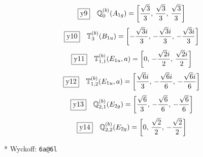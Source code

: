 \documentclass[fleqn,10pt,landscape]{jsarticle}
\begin{document}
\begin{dmath*}
\fbox{y9}\quad \mathbb{Q}_{0}^{(b)}(A_{1g})=\left[ \frac{\sqrt{3}}{3},\, \frac{\sqrt{3}}{3},\, \frac{\sqrt{3}}{3} \right]
\end{dmath*}
\begin{dmath*}
\fbox{y10}\quad \mathbb{T}_{3}^{(b)}(B_{1u})=\left[ - \frac{\sqrt{3} i}{3},\, - \frac{\sqrt{3} i}{3},\, - \frac{\sqrt{3} i}{3} \right]
\end{dmath*}
\begin{dmath*}
\fbox{y11}\quad \mathbb{T}_{1,1}^{(b)}(E_{1u},a)=\left[ 0,\, - \frac{\sqrt{2} i}{2},\, \frac{\sqrt{2} i}{2} \right]
\end{dmath*}
\begin{dmath*}
\fbox{y12}\quad \mathbb{T}_{1,2}^{(b)}(E_{1u},a)=\left[ \frac{\sqrt{6} i}{3},\, - \frac{\sqrt{6} i}{6},\, - \frac{\sqrt{6} i}{6} \right]
\end{dmath*}
\begin{dmath*}
\fbox{y13}\quad \mathbb{Q}_{2,1}^{(b)}(E_{2g})=\left[ \frac{\sqrt{6}}{3},\, - \frac{\sqrt{6}}{6},\, - \frac{\sqrt{6}}{6} \right]
\end{dmath*}
\begin{dmath*}
\fbox{y14}\quad \mathbb{Q}_{2,2}^{(b)}(E_{2g})=\left[ 0,\, \frac{\sqrt{2}}{2},\, - \frac{\sqrt{2}}{2} \right]
\end{dmath*}
\vspace{5mm}

\noindent ** Wyckoff: \texttt{6a@6l}
\end{document}
